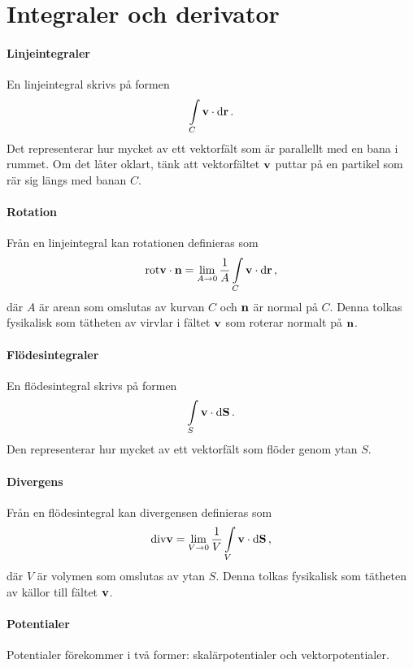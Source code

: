 \section{Integraler och derivator}

\paragraph{Linjeintegraler}
En linjeintegral skrivs på formen
\begin{align*}
	\int\limits_{C}\vb{v}\cdot\dd{\vb{r}}.
\end{align*}
Det representerar hur mycket av ett vektorfält som är parallellt med en bana i rummet. Om det låter oklart, tänk att vektorfältet $\vb{v}$ puttar på en partikel som rär sig längs med banan $C$.

\paragraph{Rotation}
Från en linjeintegral kan rotationen definieras som
\begin{align*}
	\text{rot}\vb{v}\cdot\vb{n} = \lim\limits_{A\to 0}\frac{1}{A}\int\limits_{C}\vb{v}\cdot\dd{\vb{r}},
\end{align*}
där $A$ är arean som omslutas av kurvan $C$ och $\vb{n}$ är normal på $C$. Denna tolkas fysikalisk som tätheten av virvlar i fältet $\vb{v}$ som roterar normalt på $\vb{n}$.

\paragraph{Flödesintegraler}
En flödesintegral skrivs på formen
\begin{align*}
	\int\limits_{S}\vb{v}\cdot\dd{\vb{S}}.
\end{align*}
Den representerar hur mycket av ett vektorfält som flöder genom ytan $S$.

\paragraph{Divergens}
Från en flödesintegral kan divergensen definieras som
\begin{align*}
	\text{div}\vb{v} = \lim\limits_{V\to 0}\frac{1}{V}\int\limits_{V}\vb{v}\cdot\dd{\vb{S}},
\end{align*}
där $V$ är volymen som omslutas av ytan $S$. Denna tolkas fysikalisk som tätheten av källor till fältet $\vb{v}$.

\paragraph{Potentialer}
Potentialer förekommer i två former: skalärpotentialer och vektorpotentialer.

